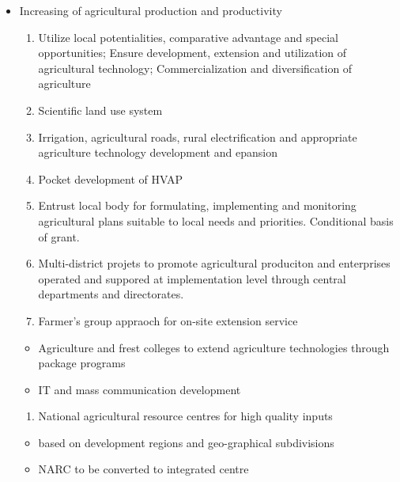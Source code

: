 \documentclass[
  openany]{book}
\providecommand{\tightlist}{%
  \setlength{\itemsep}{0pt}\setlength{\parskip}{0pt}}
\begin{document}
\begin{itemize}
\tightlist
\item
  Increasing of agricultural production and productivity

  \begin{enumerate}
  \def\labelenumi{\arabic{enumi}.}
  \tightlist
  \item
    Utilize local potentialities, comparative advantage and special opportunities; Ensure development, extension and utilization of agricultural technology; Commercialization and diversification of agriculture
  \item
    Scientific land use system
  \item
    Irrigation, agricultural roads, rural electrification and appropriate agriculture technology development and epansion
  \item
    Pocket development of HVAP
  \item
    Entrust local body for formulating, implementing and monitoring agricultural plans suitable to local needs and priorities. Conditional basis of grant.
  \item
    Multi-district projets to promote agricultural produciton and enterprises operated and suppored at implementation level through central departments and directorates.
  \item
    Farmer's group appraoch for on-site extension service
  \end{enumerate}

  \begin{itemize}
  \tightlist
  \item
    Agriculture and frest colleges to extend agriculture technologies through package programs
  \item
    IT and mass communication development
  \end{itemize}

  \begin{enumerate}
  \def\labelenumi{\arabic{enumi}.}
  \setcounter{enumi}{7}
  \tightlist
  \item
    National agricultural resource centres for high quality inputs
  \end{enumerate}

  \begin{itemize}
  \tightlist
  \item
    based on development regions and geo-graphical subdivisions
  \item
    NARC to be converted to integrated centre
  \end{itemize}


\end{itemize}
\end{document}
